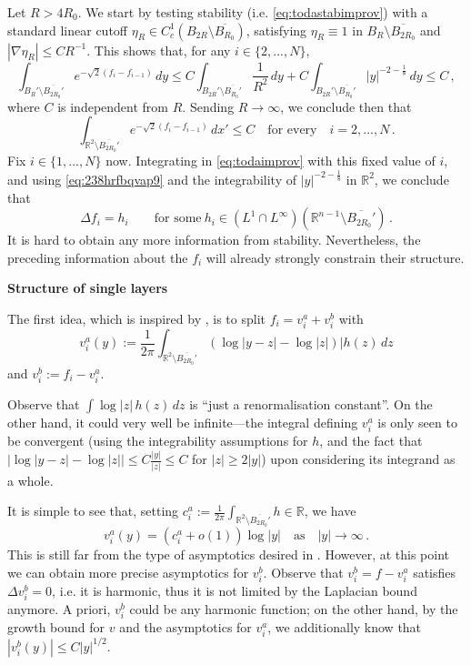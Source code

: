 \documentclass{article}
\newcommand{\R}{\mathbb{R}}
\theoremstyle{definition}
\begin{document}
Let $R>4R_0$. We start by testing stability (i.e. \eqref{eq:todastabimprov}) with a standard linear cutoff $\eta_R\in C_c^1(B_{2R}\setminus \overline{B_{R_0}})$, satisfying $\eta_R\equiv 1$ in $B_{R}\setminus \overline{B_{2R_0}}$ and $|\nabla \eta_R|\leq C R^{-1}$. This shows that, for any $i\in\{2,...,N\}$,
$$
\int_{B_R'\setminus \overline{B_{2R_0}'}} e^{-\sqrt{2}(f_i-f_{i-1})}\,dy\leq C\int_{B_{2R}'\setminus \overline{B_{R_0}'}}\frac{1}{R^2}\,dy +C\int_{B_{2R}'\setminus \overline{B_{R_0}'}} |y|^{-2-\frac{1}{8}}\,dy\leq C\,,
$$
where $C$ is independent from $R$. Sending $R\to\infty$, we conclude then that 
\begin{equation}\label{eq:238hrfbqvap9}
    \int_{\R^2\setminus \overline{B_{2R_0}'}} e^{-\sqrt{2}(f_i-f_{i-1})}\,dx'\leq C\quad\mbox{for every}\quad i=2,...,N\,.
\end{equation}
Fix $i\in\{1,...,N\}$ now. Integrating in \eqref{eq:todaimprov} with this fixed value of $i$, and using \eqref{eq:238hrfbqvap9} and the integrability of $|y|^{-2-\frac{1}{8}}$ in $\R^2$, we conclude that
\begin{equation}\label{eq:245gtqfj}
    \Delta f_i=h_i\qquad\mbox{for some}\ h_i\in (L^1\cap L^\infty)(\R^{n-1}\setminus \overline{B_{2 R_0}'})\,.
\end{equation}
It is hard to obtain any more information from stability. Nevertheless, the preceding information about the $f_i$ will already strongly constrain their structure.

{\bf Structure of single layers}

The first idea, which is inspired by \cite{CL91}, is to split $f_i=v_i^a+v_i^b$ with 
    $$v_i^a(y):=\frac{1}{2\pi}\int_{\R^2\setminus \overline{B_{2R_0}'}} (\log|y-z|-\log |z|)| h(z)\,dz$$
    and $v_i^b:=f_i-v_i^a$.

    
    Observe that $\int \log |z|\, h(z)\,dz$ is ``just a renormalisation constant''. On the other hand, it could very well be infinite---the integral defining $v_i^a$ is only seen to be convergent (using the integrability assumptions for $h$, and the fact that $\left|\log|y-z|-\log|z|\right|\leq C\frac{|y|}{|z|}\leq C$ for $|z|\geq 2|y|$) upon considering its integrand as a whole.
    
    It is simple to see that, setting $c_i^a:= \frac{1}{2\pi}\int_{\R^2\setminus \overline{B_{2R_0}'}} h\in\R$, we have
    $$v_i^a(y)=(c_i^a+o(1))\log |y| \quad\mbox{as}\quad |y|\to\infty \,.$$
    This is still far from the type of asymptotics desired in . However, at this point we can obtain more precise asymptotics for $v_i^b$. Observe that $v_i^b=f-v_i^a$ satisfies $\Delta v_i^b=0$, i.e. it is harmonic, thus it is not limited by the Laplacian bound anymore. A priori, $v_i^b$ could be any harmonic function; on the other hand, by the growth bound for $v$ and the asymptotics for $v_i^a$, we additionally know that $|v_i^b(y)|\leq C|y|^{1/2}$.
    
\end{document}
